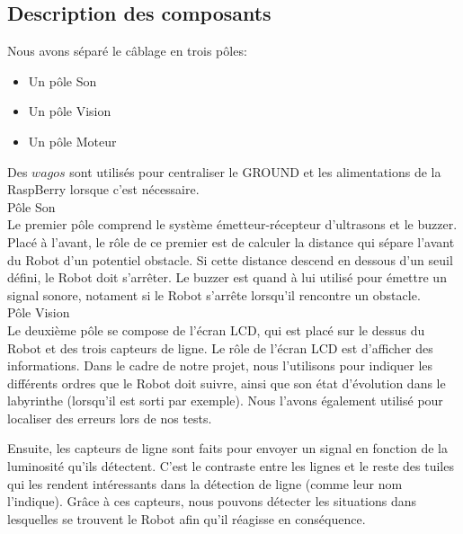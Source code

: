 \subsection{Description des composants}

Nous avons séparé le câblage en trois pôles:
\begin{itemize}
    \item Un pôle Son
    \item Un pôle Vision
    \item Un pôle Moteur
\end{itemize}

\noindent Des $wagos$ sont utilisés pour centraliser le GROUND et les alimentations de la RaspBerry lorsque c'est nécessaire.\\

\large Pôle Son \\
Le premier pôle comprend le système émetteur-récepteur d'ultrasons et le buzzer.
Placé à l'avant, le rôle de ce premier est de calculer la distance qui sépare l'avant du Robot d'un potentiel obstacle.
Si cette distance descend en dessous d'un seuil défini, le Robot doit s'arrêter.
Le buzzer est quand à lui utilisé pour émettre un signal sonore, notament si le Robot s'arrête lorsqu'il rencontre un obstacle.\\

\large Pôle Vision \\
Le deuxième pôle se compose de l'écran LCD, qui est placé sur le dessus du Robot et des trois capteurs de ligne.
Le rôle de l'écran LCD est d'afficher des informations.
Dans le cadre de notre projet, nous l'utilisons pour indiquer les différents ordres que le Robot doit suivre, ainsi que son état d'évolution dans le labyrinthe (lorsqu'il est sorti par exemple).
Nous l'avons également utilisé pour localiser des erreurs lors de nos tests.

Ensuite, les capteurs de ligne sont faits pour envoyer un signal en fonction de la luminosité qu'ils détectent.
C'est le contraste entre les lignes et le reste des tuiles qui les rendent intéressants dans la détection de ligne (comme leur nom l'indique).
Grâce à ces capteurs, nous pouvons détecter les situations dans lesquelles se trouvent le Robot afin qu'il réagisse en conséquence.\\



